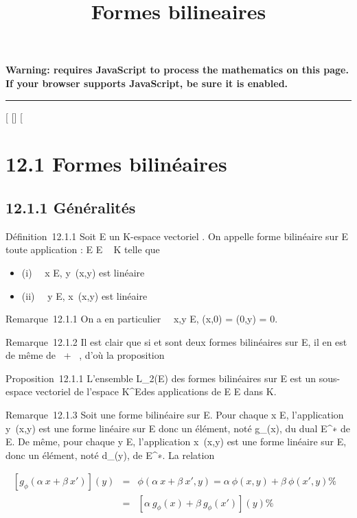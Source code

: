 \documentclass[]{article}
\title{Formes bilineaires}
\author{}
\date{}
\begin{document}
\maketitle

\textbf{Warning: 
requires JavaScript to process the mathematics on this page.\\ If your
browser supports JavaScript, be sure it is enabled.}

\begin{center}\rule{3in}{0.4pt}\end{center}

[
[]
[

\section{12.1 Formes bilinéaires}

\subsection{12.1.1 Généralités}

Définition~12.1.1 Soit E un K-espace vectoriel . On appelle forme
bilinéaire sur E toute application \phi : E \times E \rightarrow~ K telle que

\begin{itemize}
\itemsep1pt\parskip0pt
\item
  (i) \forall~~x \in E,
  y\mapsto~\phi(x,y) est linéaire
\item
  (ii) \forall~~y \in E,
  x\mapsto~\phi(x,y) est linéaire
\end{itemize}

Remarque~12.1.1 On a en particulier \forall~~x,y \in E,
\phi(x,0) = \phi(0,y) = 0.

Remarque~12.1.2 Il est clair que si \phi et \psi sont deux formes bilinéaires
sur E, il en est de même de \alpha~\phi + \beta~\psi, d'où la proposition

Proposition~12.1.1 L'ensemble L_2(E) des formes bilinéaires sur
E est un sous-espace vectoriel de l'espace K^E\timesE des
applications de E \times E dans K.

Remarque~12.1.3 Soit \phi une forme bilinéaire sur E. Pour chaque x \in E,
l'application y\mapsto~\phi(x,y) est une forme linéaire
sur E donc un élément, noté g_\phi(x), du dual E^∗ de
E. De même, pour chaque y \in E, l'application
x\mapsto~\phi(x,y) est une forme linéaire sur E, donc
un élément, noté d_\phi(y), de E^∗. La relation

\begin{align*} \left
[g_\phi(\alpha~x + \beta~x')\right ](y)& =& \phi(\alpha~x +
\beta~x',y) = \alpha~\phi(x,y) + \beta~\phi(x',y)\%& \\ & =&
\left [\alpha~g_\phi(x) +
\beta~g_\phi(x')\right ](y) \%&
\\ \end{align*}
\end{document}
